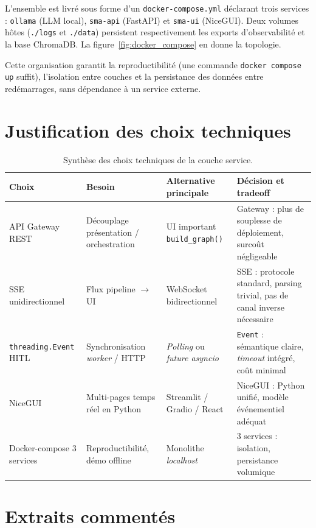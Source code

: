 L'ensemble est livré sous forme d'un \texttt{docker-compose.yml} déclarant trois services : \texttt{ollama} (LLM local), \texttt{sma-api} (FastAPI) et \texttt{sma-ui} (NiceGUI). Deux volumes hôtes (\texttt{./logs} et \texttt{./data}) persistent respectivement les exports d'observabilité et la base ChromaDB. La figure~\ref{fig:docker_compose} en donne la topologie.



Cette organisation garantit la reproductibilité (une commande \texttt{docker compose up} suffit), l'isolation entre couches et la persistance des données entre redémarrages, sans dépendance à un service externe.

\section{Justification des choix techniques}

\begin{table}[H]
\centering
\small
\begin{tabularx}{\textwidth}{@{}lXXX@{}}
\toprule
\textbf{Choix} & \textbf{Besoin} & \textbf{Alternative principale} & \textbf{Décision et tradeoff} \\
\midrule
API Gateway REST & Découplage présentation / orchestration & UI important \texttt{build\_graph()} & Gateway : plus de souplesse de déploiement, surcoût négligeable \\
SSE unidirectionnel & Flux pipeline $\rightarrow$ UI & WebSocket bidirectionnel & SSE : protocole standard, parsing trivial, pas de canal inverse nécessaire \\
\texttt{threading.Event} HITL & Synchronisation \textit{worker} / HTTP & \textit{Polling} ou \textit{future asyncio} & \texttt{Event} : sémantique claire, \textit{timeout} intégré, coût minimal \\
NiceGUI & Multi-pages temps réel en Python & Streamlit / Gradio / React & NiceGUI : Python unifié, modèle événementiel adéquat \\
Docker-compose 3 services & Reproductibilité, démo offline & Monolithe \textit{localhost} & 3 services : isolation, persistance volumique \\
\bottomrule
\end{tabularx}
\caption{Synthèse des choix techniques de la couche service.}
\end{table}

\section{Extraits commentés}

